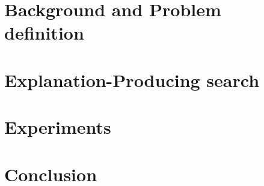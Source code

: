 \documentclass[runningheads]{llncs}
\begin{document}
\section{Background and Problem definition}

\section{Explanation-Producing search}

\section{Experiments}

\section{Conclusion}

%
%


\end{document}
